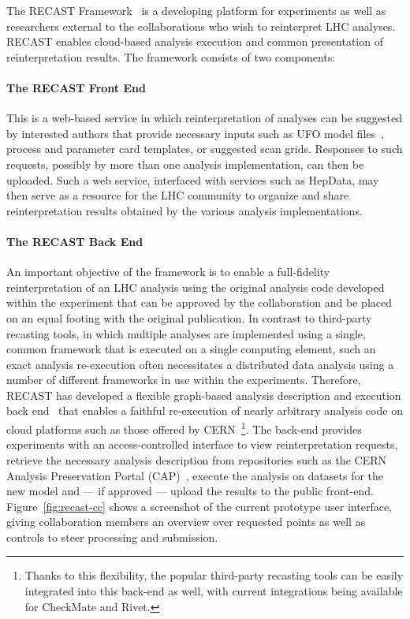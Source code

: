 The RECAST Framework~\cite{Cranmer:2010hk} is a developing platform for experiments as well as researchers external to the collaborations who wish to reinterpret LHC analyses. RECAST enables cloud-based analysis execution and common presentation of reinterpretation results. The framework consists of two components:

\paragraph{The RECAST Front End} This is a web-based service in which reinterpretation of analyses can be suggested by interested authors that provide necessary inputs such as UFO model files~\cite{Degrande:2011ua}, process and parameter card templates, or suggested scan grids. Responses to such requests, possibly by more than one analysis implementation, can then be uploaded. Such a web service, interfaced with services such as HepData, may then serve as a resource for the LHC community to organize and share reinterpretation results obtained by the various analysis implementations.

\paragraph{The RECAST Back End} An important objective of the framework is to enable a full-fidelity reinterpretation of an LHC analysis using the original analysis code developed within the experiment that can be approved by the collaboration and be placed on an equal footing with the original publication. In contrast to third-party recasting tools, in which multiple analyses are implemented using a single, common framework that is executed on a single computing element, such an exact analysis re-execution often necessitates a distributed data analysis using a number of different frameworks in use within the experiments. Therefore, RECAST has developed a flexible graph-based analysis description and execution back end~\cite{Heinrich:2297545} that enables a faithful re-execution of nearly arbitrary analysis code on cloud platforms such as those offered by CERN~\footnote{Thanks to this flexibility, the popular third-party recasting tools can be easily integrated into this back-end as well, with current integrations being available for CheckMate and Rivet.}. The back-end provides experiments with an access-controlled interface to view reinterpretation requests, retrieve the necessary analysis description from repositories such as the CERN Analysis Preservation Portal (CAP)~\cite{CAP}, execute the analysis on datasets for the new model and --- if approved --- upload the results to the public front-end. Figure~\ref{fig:recast-cc} shows a screenshot of the current prototype user interface, giving collaboration members an overview over requested points as well as controls to steer processing and submission.

